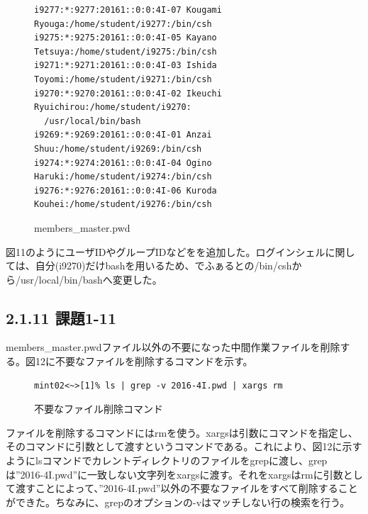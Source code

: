 \documentclass[12pt]{jreport}
\begin{document}
                \begin{figure}[H]
                    \begin{center}
                        \begin{screen}
                            \begin{verbatim}
i9277:*:9277:20161::0:0:4I-07 Kougami Ryouga:/home/student/i9277:/bin/csh
i9275:*:9275:20161::0:0:4I-05 Kayano Tetsuya:/home/student/i9275:/bin/csh
i9271:*:9271:20161::0:0:4I-03 Ishida Toyomi:/home/student/i9271:/bin/csh
i9270:*:9270:20161::0:0:4I-02 Ikeuchi Ryuichirou:/home/student/i9270:
  /usr/local/bin/bash
i9269:*:9269:20161::0:0:4I-01 Anzai Shuu:/home/student/i9269:/bin/csh
i9274:*:9274:20161::0:0:4I-04 Ogino Haruki:/home/student/i9274:/bin/csh
i9276:*:9276:20161::0:0:4I-06 Kuroda Kouhei:/home/student/i9276:/bin/csh
                            \end{verbatim}
                        \end{screen}
                        \caption{members\_master.pwd}
                        \label{11}
                    \end{center}
                \end{figure}
                図11のようにユーザIDやグループIDなどをを追加した。ログインシェルに関しては、自分(i9270)だけbashを用いるため、でふぁるとの/bin/cshから/usr/local/bin/bashへ変更した。

            \subsection*{2.1.11 課題1-11}
                members\_master.pwdファイル以外の不要になった中間作業ファイルを削除する。図12に不要なファイルを削除するコマンドを示す。
                \begin{figure}[H]
                    \begin{center}
                        \begin{screen}
                            \begin{verbatim}
mint02<~>[1]% ls | grep -v 2016-4I.pwd | xargs rm
                            \end{verbatim}
                        \end{screen}
                        \caption{不要なファイル削除コマンド}
                        \label{12}
                    \end{center}
                \end{figure}
                ファイルを削除するコマンドにはrmを使う。xargsは引数にコマンドを指定し、そのコマンドに引数として渡すというコマンドである。これにより、図12に示すようにlsコマンドでカレントディレクトリのファイルをgrepに渡し、grepは''2016-4I.pwd''に一致しない文字列をxargsに渡す。それをxargsはrmに引数として渡すことによって、''2016-4I.pwd''以外の不要なファイルをすべて削除することができた。ちなみに、grepのオプションの-vはマッチしない行の検索を行う。
\end{document}
